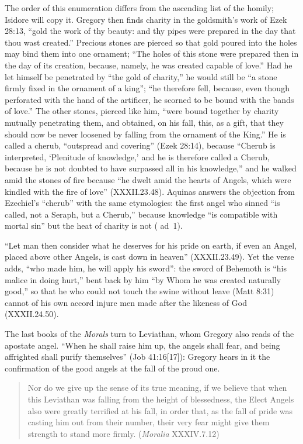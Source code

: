 \noindent The order of this enumeration differs from the ascending list of
the homily; Isidore will copy it. Gregory then finds charity in the
goldsmith's work of Ezek 28:13, ``gold the work of thy beauty: and thy pipes
were prepared in the day that thou wast created.'' Precious stones are
pierced so that gold poured into the holes may bind them into one ornament;
``The holes of this stone were prepared then in the day of its creation,
because, namely, he was created capable of love.'' Had he let himself be
penetrated by ``the gold of charity,'' he would still be ``a stone firmly
fixed in the ornament of a king''; ``he therefore fell, because, even though
perforated with the hand of the artificer, he scorned to be bound with the
bands of love.'' The other stones, pierced like him, ``were bound together by
charity mutually penetrating them, and obtained, on his fall, this, as a
gift, that they should now be never loosened by falling from the ornament of
the King.'' He is called a cherub, ``outspread and covering'' (Ezek 28:14),
because ``Cherub is interpreted, `Plenitude of knowledge,' and he is
therefore called a Cherub, because he is not doubted to have surpassed all in
his knowledge,'' and he walked amid the stones of fire because ``he dwelt
amid the hearts of Angels, which were kindled with the fire of love''
(XXXII.23.48). Aquinas answers the objection from Ezechiel's ``cherub''
with the same etymologies: the first angel who sinned ``is called, not a
Seraph, but a Cherub,'' because knowledge ``is compatible with mortal sin''
but the heat of charity is not ( ad~1).

``Let man then consider what he deserves for his pride on earth, if even an
Angel, placed above other Angels, is cast down in heaven'' (XXXII.23.49).
Yet the verse adds, ``who made him, he will apply his sword'': the sword of
Behemoth is ``his malice in doing hurt,'' bent back by him ``by Whom he was
created naturally good,'' so that he who could not touch the swine without
leave (Matt 8:31) cannot of his own accord injure men made after the likeness
of God (XXXII.24.50).

The last books of the \emph{Morals} turn to Leviathan, whom Gregory also reads
of the apostate angel. ``When he shall raise him up, the angels shall fear,
and being affrighted shall purify themselves'' (Job 41:16[17]): Gregory hears
in it the confirmation of the good angels at the fall of the proud one.

\begin{quote}
Nor do we give up the sense of its true meaning, if we believe that when this
Leviathan was falling from the height of blessedness, the Elect Angels also
were greatly terrified at his fall, in order that, as the fall of pride was
casting him out from their number, their very fear might give them strength
to stand more firmly. (\emph{Moralia} XXXIV.7.12)
\end{quote}

